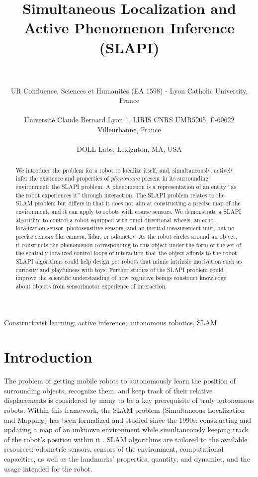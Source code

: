 \documentclass[pmlr]{jmlr}%
\title[SLAPI]{Simultaneous Localization and Active Phenomenon Inference (SLAPI)}
\author{\Name{Olivier L. Georgeon} \Email{ogeorgeon@univ-catholyon.fr}\\
  \Name{Juan R. Vidal} \Email{jvidal@univ-catholyon.fr}\\
  \addr UR Confluence, Sciences et Humanités (EA 1598) - Lyon Catholic University, France\\
  \Name{Titouan Knockaert} \Email{titouan.knockaert@gmail.com}\\
  \addr Université Claude Bernard Lyon 1, LIRIS CNRS UMR5205, F-69622 Villeurbanne, France\\
  \Name{Paul Robertson} \Email{paulr@dollabs.com}\\
  \addr DOLL Labs, Lexignton, MA, USA\\
}
\begin{document}
\maketitle

\begin{abstract}
We introduce the problem for a robot to  localize itself, and, simultaneously, actively infer the existence and properties of \textit{phenomena} present in its surrounding environment: the SLAPI problem. 
A phenomenon is a representation of an entity ``as the robot experiences it'' through interaction. 
The SLAPI problem relates to the SLAM problem but differs in that it does not aim at constructing a precise map of the environment, and it can apply to robots with coarse sensors. 
We demonstrate a SLAPI algorithm to control a robot equipped with omni-directional wheels, an echo-localization sensor, photosensitive sensors, and an inertial measurement unit, but no precise sensors like camera, lidar, or odometry. 
As the robot circles around an object, it constructs the phenomenon corresponding to this object under the form of the set of the spatially-localized control loops of interaction that the object affords to the robot. 
SLAPI algorithms could help design pet robots that mimic intrinsic motivation such as curiosity and playfulness with toys. 
Further studies of the SLAPI problem could improve the scientific understanding of how cognitive beings construct knowledge about objects from sensorimotor experience of interaction.
\end{abstract}

\begin{keywords}
Constructivist learning; active inference; autonomous robotics, SLAM
\end{keywords}

\section{Introduction}
\label{sec:intro}

The problem of getting mobile robots to autonomously learn the position of surrounding objects, recognize them, and keep track of their relative displacements is considered by many to be a key prerequisite of truly autonomous robots. 
Within this framework, the SLAM problem (Simultaneous Localization and Mapping) has been formalized and studied since the 1990s: constructing and updating a map of an unknown environment while simultaneously keeping track of the robot's position within it \citep[e.g.,][]{taketomi_visual_2017}.
SLAM algorithms are tailored to the available resources: odometric sensors, sensors of the environment, computational capacities, as well as the landmarks' properties, quantity, and dynamics, and the usage intended for the robot.
\end{document}
